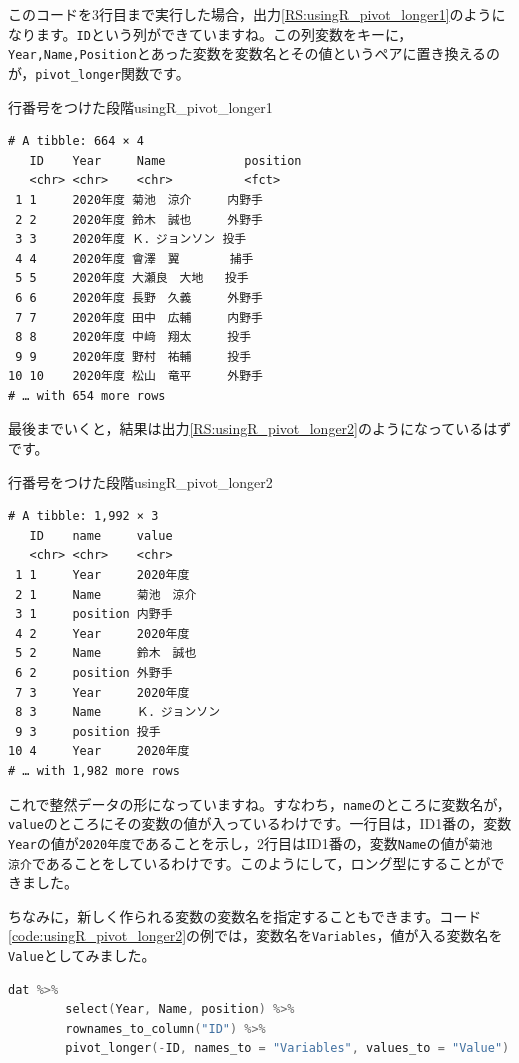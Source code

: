 \documentclass{ltjsbook}
\begin{document}
このコードを3行目まで実行した場合，出力\ref{RS:usingR_pivot_longer1}のようになります。\verb|ID|という列ができていますね。この列変数をキーに，\verb|Year,Name,Position|とあった変数を変数名とその値というペアに置き換えるのが，\verb|pivot_longer|関数です。
\begin{Rscreen}{行番号をつけた段階}{usingR_pivot_longer1}
	\begin{verbatim}
# A tibble: 664 × 4
   ID    Year     Name           position
   <chr> <chr>    <chr>          <fct>   
 1 1     2020年度 菊池　涼介     内野手  
 2 2     2020年度 鈴木　誠也     外野手  
 3 3     2020年度 Ｋ．ジョンソン 投手    
 4 4     2020年度 會澤　翼       捕手    
 5 5     2020年度 大瀬良　大地   投手    
 6 6     2020年度 長野　久義     外野手  
 7 7     2020年度 田中　広輔     内野手  
 8 8     2020年度 中﨑　翔太     投手    
 9 9     2020年度 野村　祐輔     投手    
10 10    2020年度 松山　竜平     外野手  
# … with 654 more rows
\end{verbatim}
\end{Rscreen}
最後までいくと，結果は出力\ref{RS:usingR_pivot_longer2}のようになっているはずです。
\begin{Rscreen}{行番号をつけた段階}{usingR_pivot_longer2}
	\begin{verbatim}
# A tibble: 1,992 × 3
   ID    name     value         
   <chr> <chr>    <chr>         
 1 1     Year     2020年度      
 2 1     Name     菊池　涼介    
 3 1     position 内野手        
 4 2     Year     2020年度      
 5 2     Name     鈴木　誠也    
 6 2     position 外野手        
 7 3     Year     2020年度      
 8 3     Name     Ｋ．ジョンソン
 9 3     position 投手          
10 4     Year     2020年度      
# … with 1,982 more rows
\end{verbatim}
\end{Rscreen}
これで整然データの形になっていますね。すなわち，\verb|name|のところに変数名が，\verb|value|のところにその変数の値が入っているわけです。一行目は，ID1番の，変数\verb|Year|の値が\verb|2020年度|であることを示し，2行目はID1番の，変数\verb|Name|の値が\verb|菊池　涼介|であることをしているわけです。このようにして，ロング型にすることができました。

ちなみに，新しく作られる変数の変数名を指定することもできます。コード\ref{code:usingR_pivot_longer2}の例では，変数名を\verb|Variables|，値が入る変数名を\verb|Value|としてみました。
\begin{lstlisting}[language=c++,label={code:usingR_pivot_longer2},caption={出力する変数名の指定}]
        dat %>%
        select(Year, Name, position) %>%
        rownames_to_column("ID") %>%
        pivot_longer(-ID, names_to = "Variables", values_to = "Value")
\end{lstlisting}
\end{document}

